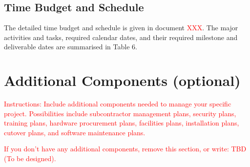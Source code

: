 \documentclass{article}
\begin{document}
\subsection{Time Budget and Schedule}
The detailed time budget and schedule is given in document \textcolor{red}{XXX}. The major
activities and tasks, required calendar dates, and their required milestone and
deliverable dates are summarised in Table 6.

\section{Additional Components (optional)}

\textcolor{red}{Instructions: Include additional components needed to manage your specific
project. Possibilities include subcontractor management plans, security plans,
training plans, hardware procurement plans, facilities plans, installation plans,
cutover plans, and software maintenance plans.}


\vspace{0.5cm}
\textcolor{red}{If you don’t have any additional components, remove this section, or write: TBD
(To be designed).}
\end{document}
